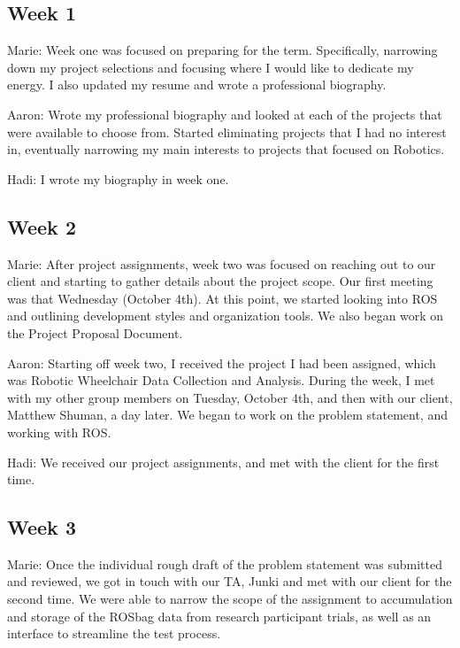 \documentclass[onecolumn, draftclsnofoot,10pt, compsoc]{IEEEtran}
\begin{document}
\subsection{Week 1}
Marie: Week one was focused on preparing for the term. Specifically, narrowing down my project selections and focusing where I would like to dedicate my energy. I also updated my resume and wrote a professional biography.\par

Aaron: Wrote my professional biography and looked at each of the projects that were available to choose from. Started eliminating projects that I had no interest in, eventually narrowing my main interests to projects that focused on Robotics.\par

Hadi: I wrote my biography in week one.\par

\subsection{Week 2}
Marie: After project assignments, week two was focused on reaching out to our client and starting to gather details about the project scope. Our first meeting was that Wednesday (October 4th). At this point, we started looking into ROS and outlining development styles and organization tools. We also began work on the Project Proposal Document.\par

Aaron: Starting off week two, I received the project I had been assigned, which was Robotic Wheelchair Data Collection and Analysis. During the week, I met with my other group members on Tuesday, October 4th, and then with our client, Matthew Shuman, a day later. We began to work on the problem statement, and working with ROS.\par

Hadi: We received our project assignments, and met with the client for the first time.

\subsection{Week 3}
Marie: Once the individual rough draft of the problem statement was submitted and reviewed, we got in touch with our TA, Junki and met with our client for the second time. We were able to narrow the scope of the assignment to accumulation and storage of the ROSbag data from research participant trials, as well as an interface to streamline the test process.\par
\end{document}
